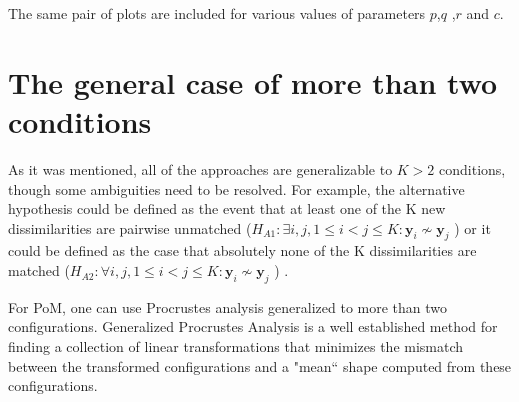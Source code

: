 \documentclass[11pt]{article} %
\begin{document}
The same pair of plots are included for various values of parameters $p$,$q$ ,$r$ and $c$.






\section{The general case of more than two conditions}


As it was mentioned, all of the approaches are generalizable to $K>2$ conditions, though some ambiguities need to be resolved. For example,  the alternative hypothesis could be  defined as the event that at least one of the K new dissimilarities are pairwise unmatched ($ H_{A1}: \exists i, j , 1\leq i < j \leq K :\bm{y}_{i} \nsim \bm{y}_{j} $ ) or it could be defined as the case that absolutely none of the K dissimilarities are matched   ($H_{A2}: \forall i, j , 1\leq i < j \leq K :\bm{y}_{i} \nsim \bm{y}_{j}$ )  .

For PoM, one can use Procrustes analysis  generalized to more than two configurations. Generalized Procrustes Analysis \cite{GPCA} is a well established method for finding a collection of linear transformations that minimizes the mismatch between the transformed configurations and a "mean`` shape computed from these configurations. 
\end{document}
